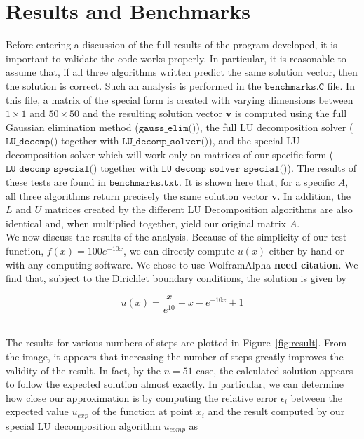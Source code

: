 \documentclass[12pt]{article}
\numberwithin{equation}{section}
\begin{document}
\section{Results and Benchmarks}
\label{sec:results}

Before entering a discussion of the full results of the program developed, it is important to validate the code works properly.  In particular, it is reasonable to assume that, if all three algorithms written predict the same solution vector, then the solution is correct.  Such an analysis is performed in the $\texttt{benchmarks.C}$ file.  In this file, a matrix of the special form is created with varying dimensions between $1\times1$ and $50\times50$ and the resulting solution vector $\textbf{v}$ is computed using the full Gaussian elimination method ($\texttt{gauss\_elim()}$), the full LU decomposition solver ($\texttt{LU\_decomp()}$ together with $\texttt{LU\_decomp\_solver()}$), and the special LU decomposition solver which will work only on matrices of our specific form ($\texttt{LU\_decomp\_special()}$ together with $\texttt{LU\_decomp\_solver\_special()}$).  The results of these tests are found in $\texttt{benchmarks.txt}$.  It is shown here that, for a specific $A$, all three algorithms return precisely the same solution vector $\textbf{v}$.  In addition, the $L$ and $U$ matrices created by the different LU Decomposition algorithms are also identical and, when multiplied together, yield our original matrix $A$.
\\\indent We now discuss the results of the analysis.  Because of the simplicity of our test function, $f\left(x\right)=100e^{-10x}$, we can directly compute $u\left(x\right)$ either by hand or with any computing software.  We chose to use WolframAlpha \textbf{need citation}.  We find that, subject to the Dirichlet boundary conditions, the solution is given by 

\begin{equation}
\label{eq:expectsol}
u\left(x\right)=\frac{x}{e^{10}}-x-e^{-10x}+1
\end{equation}

\\\indent The results for various numbers of steps are plotted in Figure~\ref{fig:result}.  From the image, it appears that increasing the number of steps greatly improves the validity of the result.  In fact, by the $n=51$ case, the calculated solution appears to follow the expected solution almost exactly.  In particular, we can determine how close our approximation is by computing the relative error $\epsilon_{i}$ between the expected value $u_{exp}$ of the function at point $x_{i}$ and the result computed by our special LU decomposition algorithm $u_{comp}$ as 
\end{document}
